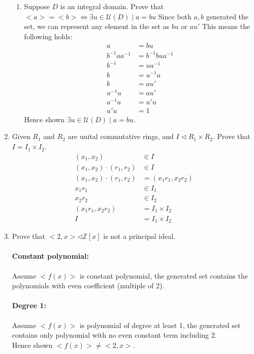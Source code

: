 \documentclass[12pt]{article}
\begin{document}
\begin{enumerate}
\begin{enumerate}
			\item Suppose $D$ is an integral domain. Prove that $<a> = <b>
				\Leftrightarrow \exists u\in \mathcal{U}(D) \mid a=bu$ Since both $a,b$
				generated the set, we can represent any element in the set as $bu$ or
				$au'$ This means the following holds:
				\begin{align*}
					a &= bu\\
					b^{-1}aa^{-1} &= b^{-1}bua^{-1}\\
					b^{-1} &= ua^{-1}\\
					b &= u^{-1}a\\
					b &= au'\\
					u^{-1}a &= au'\\
					a^{-1}a &= u'u\\
					u'u &= 1
				\end{align*}
				Hence shown $\exists u\in \mathcal{U}(D) \mid a=bu$.
		\end{enumerate}

	\item Given $R_1$ and $R_2$ are unital commutative rings, and $I \lhd R_1
		\times R_2$. Prove that $I = I_1 \times I_2$.
		\begin{align*}
			(x_1, x_2) &\in I\\
			(x_1, x_2)\cdot(r_1, r_2) &\in I\\
			(x_1, x_2)\cdot(r_1, r_2) &= (x_1r_1, x_2r_2) \\
			x_1r_1 &\in I_1\\
			x_2r_2 &\in I_2\\
			(x_1r_1, x_2r_2) &= I_1 \times I_2\\
			I &= I_1 \times I_2
		\end{align*}

	\item Prove that $<2,x> \lhd \mathbb{Z}[x]$ is not a principal ideal.
		\paragraph{Constant polynomial:}Assume $<f(x)>$ is constant polynomial,
		the generated set contains the polynomials with even coefficient (multiple
		of 2).
		\paragraph{Degree 1:}Assume $<f(x)>$ is polynomial of degree at least 1, the
		generated set contains only polynomial with no even constant term including
		2.\\
		Hence shown $<f(x)> \neq <2,x>$.


\end{enumerate}
\end{document}
